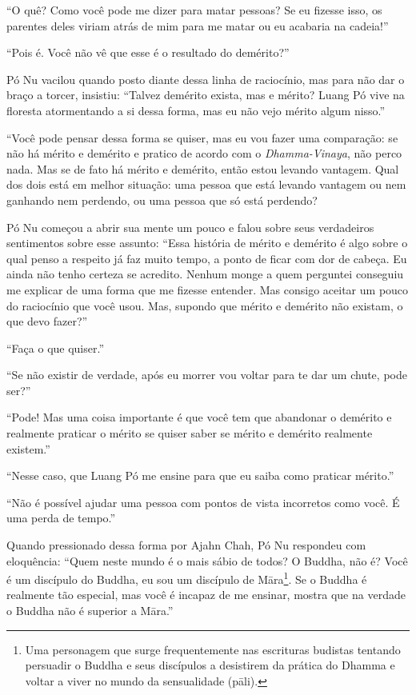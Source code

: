 ``O quê? Como você pode me dizer para matar pessoas? Se eu fizesse isso,
os parentes deles viriam atrás de mim para me matar ou eu acabaria na
cadeia!''

``Pois é. Você não vê que esse é o resultado do demérito?''

Pó Nu vacilou quando posto diante dessa linha de raciocínio, mas para
não dar o braço a torcer, insistiu: ``Talvez demérito exista, mas e
mérito? Luang Pó vive na floresta atormentando a si dessa forma, mas eu
não vejo mérito algum nisso.''

``Você pode pensar dessa forma se quiser, mas eu vou fazer uma
comparação: se não há mérito e demérito e pratico de acordo com o
\emph{Dhamma-Vinaya}, não perco nada. Mas se de fato há mérito e
demérito, então estou levando vantagem. Qual dos dois está em melhor
situação: uma pessoa que está levando vantagem ou nem ganhando nem
perdendo, ou uma pessoa que só está perdendo?

Pó Nu começou a abrir sua mente um pouco e falou sobre seus verdadeiros
sentimentos sobre esse assunto: ``Essa história de mérito e demérito é
algo sobre o qual penso a respeito já faz muito tempo, a ponto de ficar
com dor de cabeça. Eu ainda não tenho certeza se acredito. Nenhum monge
a quem perguntei conseguiu me explicar de uma forma que me fizesse
entender. Mas consigo aceitar um pouco do raciocínio que você usou. Mas,
supondo que mérito e demérito não existam, o que devo fazer?''

``Faça o que quiser.''

``Se não existir de verdade, após eu morrer vou voltar para te dar um
chute, pode ser?''

``Pode! Mas uma coisa importante é que você tem que abandonar o demérito
e realmente praticar o mérito se quiser saber se mérito e demérito
realmente existem.''

``Nesse caso, que Luang Pó me ensine para que eu saiba como praticar
mérito.''

``Não é possível ajudar uma pessoa com pontos de vista incorretos como
você. É uma perda de tempo.''

Quando pressionado dessa forma por Ajahn Chah, Pó Nu respondeu com
eloquência: ``Quem neste mundo é o mais sábio de todos? O Buddha, não é?
Você é um discípulo do Buddha, eu sou um discípulo de Māra\footnote{Uma
  personagem que surge frequentemente nas escrituras budistas tentando
  persuadir o Buddha e seus discípulos a desistirem da prática do Dhamma
  e voltar a viver no mundo da sensualidade (pāli).}. Se o Buddha é
realmente tão especial, mas você é incapaz de me ensinar, mostra que na
verdade o Buddha não é superior a Māra.''

